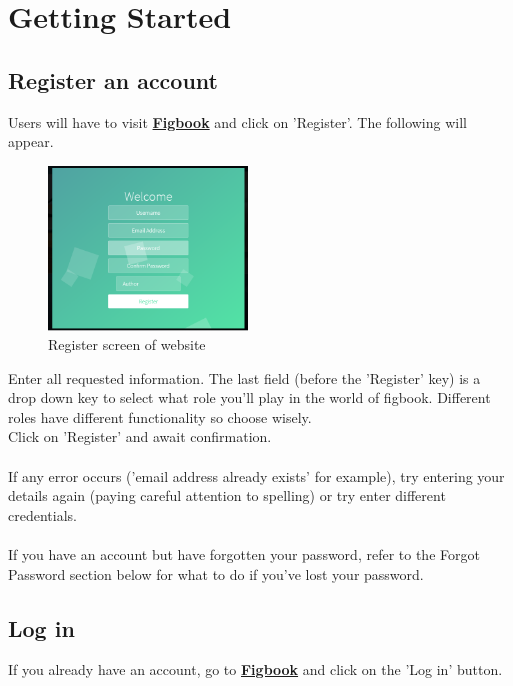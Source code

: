 \section{Getting Started}
\subsection{Register an account}
\par{Users will have to visit \href{https://github.com/SpheMalo/COS-301-Main-Project}{\textbf{Figbook}} and click on 'Register'. The following will appear. }

\begin{figure}[h]
	\centering
	\includegraphics[width=200px]{images/register.png}
	\caption{Register screen of website}
\end{figure}

\par{Enter all requested information. The last field (before the 'Register' key) is a drop down key to select what role you'll play in the world of figbook. Different roles have different functionality so choose wisely. \\ Click on 'Register' and await confirmation.\\ \\ If any error occurs ('email address already exists' for example), try entering your details again (paying careful attention to spelling) or try enter different credentials. \\ \\If you have an account but have forgotten your password, refer to the Forgot Password section below for what to do if you've lost your password. }


\subsection{Log in}
\par{If you already have an account, go to \href{https://github.com/SpheMalo/COS-301-Main-Project}{\textbf{Figbook}} and click on the 'Log in' button. }

